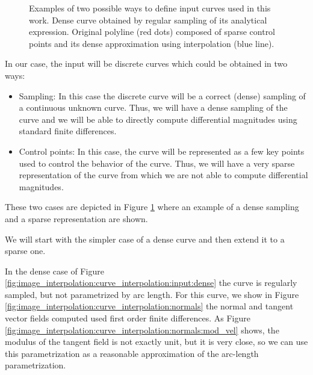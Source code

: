 \documentclass{ipol}
\newcommand{\chapFiveDir}{images/chapter_05a}
\begin{document}
\begin{figure}[h]
	\centering
	\caption{Examples of two possible ways to define input curves used in this work. 
		\protect{} Dense curve obtained by regular sampling of its analytical expression.
		\protect{} Original polyline (red dots) composed of sparse control points and its dense approximation using interpolation (blue line). }
	\label{fig:image_interpolation:curve_interpolation:input}
\end{figure}

In our case, the input will be discrete curves which could be obtained in two ways: 
\begin{itemize}
 \item Sampling: In this case the discrete curve will be a correct (dense) sampling of a continuous unknown curve. Thus, we will have a dense sampling of the curve and we will be able to directly compute differential magnitudes using standard finite differences.
 \item Control points: In this case, the curve will be represented as a few key points used to control the behavior of the curve. Thus, we will have a very sparse representation of the curve from which we are not able to compute differential magnitudes.
\end{itemize}

These two cases are depicted in Figure \ref{fig:image_interpolation:curve_interpolation:input} where an example of a dense sampling and a sparse representation are shown.

We will start with the simpler case of a dense curve and then extend it to a sparse one.

In the dense case of Figure \ref{fig:image_interpolation:curve_interpolation:input:dense} the curve is regularly sampled, but not parametrized by arc length. For this curve, we show in Figure \ref{fig:image_interpolation:curve_interpolation:normals} the normal and tangent vector fields computed used first order finite differences. As Figure \ref{fig:image_interpolation:curve_interpolation:normals:mod_vel} shows, the modulus of the tangent field is not exactly unit, but it is very close, so we can use this parametrization as a reasonable approximation of the arc-length parametrization. %
\end{document}
